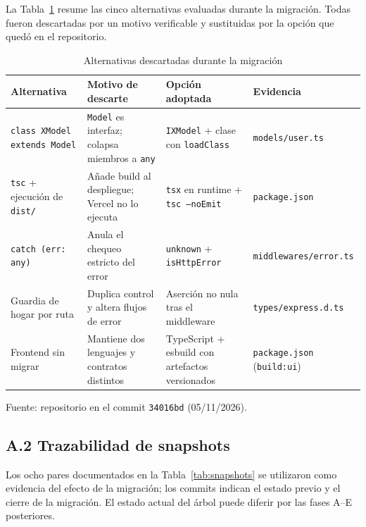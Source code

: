 \documentclass[conference]{IEEEtran}
\begin{document}
La Tabla~\ref{tab:alternativas} resume las cinco alternativas evaluadas durante
la migración. Todas fueron descartadas por un motivo verificable y sustituidas
por la opción que quedó en el repositorio.

\begin{table}[!t]
\caption{Alternativas descartadas durante la migración}
\label{tab:alternativas}
\centering
\footnotesize
\begin{tabular}{@{}>{\raggedright\arraybackslash}p{1.55cm}>{\raggedright\arraybackslash}p{1.75cm}>{\raggedright\arraybackslash}p{2.0cm}>{\raggedright\arraybackslash}p{2.1cm}@{}}
\toprule
Alternativa & Motivo de descarte & Opción adoptada & Evidencia \\
\midrule
\texttt{class XModel extends Model} & \texttt{Model} es interfaz; colapsa miembros a \texttt{any} & \texttt{IXModel} + clase con \texttt{loadClass} & \texttt{models/\allowbreak user.ts} \\
\texttt{tsc} + ejecución de \texttt{dist/} & Añade build al despliegue; Vercel no lo ejecuta & \texttt{tsx} en runtime + \texttt{tsc --noEmit} & \texttt{package.json} \\
\texttt{catch (err: any)} & Anula el chequeo estricto del error & \texttt{unknown} + \texttt{isHttpError} & \texttt{middlewares/\allowbreak error.ts} \\
Guardia de hogar por ruta & Duplica control y altera flujos de error & Aserción no nula tras el middleware & \texttt{types/\allowbreak express.d.ts} \\
Frontend sin migrar & Mantiene dos lenguajes y contratos distintos & TypeScript + esbuild con artefactos versionados & \texttt{package.json} (\texttt{build:ui}) \\
\bottomrule
\end{tabular}

\vspace{2pt}
{\footnotesize Fuente: repositorio en el commit \texttt{34016bd} (05/11/2026).}
\end{table}

\subsection*{A.2 Trazabilidad de snapshots}

Los ocho pares documentados en la Tabla~\ref{tab:snapshots} se utilizaron como
evidencia del efecto de la migración; los commits indican el estado previo y el
cierre de la migración. El estado actual del árbol puede diferir por las fases
A--E posteriores.
\end{document}
